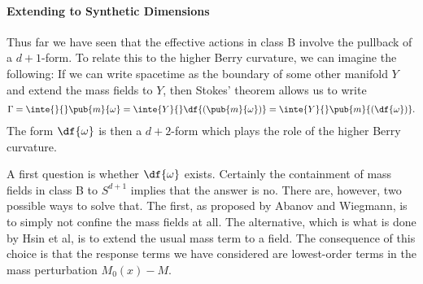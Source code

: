 \paragraph{Extending to Synthetic Dimensions}
Thus far we have seen that the effective actions in class B involve the pullback of a $d + 1$-form. To relate this to the higher Berry curvature, we can imagine the following: If we can write spacetime as the boundary of some other manifold $Y$ and extend the mass fields to $Y$, then Stokes' theorem allows us to write
\begin{align*}
	\Gamma = \inte{}{}\pub{m}{\omega} = \inte{Y}{}\df{(\pub{m}{\omega})} = \inte{Y}{}\pub{m}{(\df{\omega})}.
\end{align*}
The form $\df{\omega}$ is then a $d + 2$-form which plays the role of the higher Berry curvature.

A first question is whether $\df{\omega}$ exists. Certainly the containment of mass fields in class B to $S^{d + 1}$ implies that the answer is no. There are, however, two possible ways to solve that. The first, as proposed by Abanov and Wiegmann, is to simply not confine the mass fields at all. The alternative, which is what is done by Hsin et al, is to extend the usual mass term to a field. The consequence of this choice is that the response terms we have considered are lowest-order terms in the mass perturbation $M_{0}(x) - M$.

